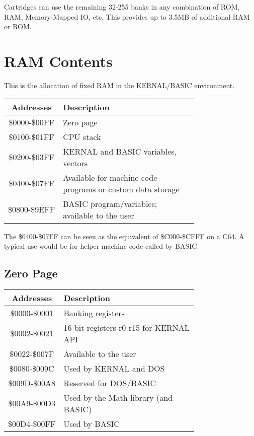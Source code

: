 Cartridges can use the remaining 32-255 banks in any combination of ROM, RAM,
Memory-Mapped IO, etc.  This provides up to 3.5MB of additional RAM or ROM.\\

\section{RAM Contents}

This is the allocation of fixed RAM in the KERNAL/BASIC environment.\\

\begin{tabular}{|c|p{0.75\linewidth}|}
	\hline
	{\bfseries Addresses} & {\bfseries Description}\\ \hline
	\$0000-\$00FF & Zero page\\ \hline
	\$0100-\$01FF & CPU stack\\ \hline
	\$0200-\$03FF & KERNAL and BASIC variables, vectors\\ \hline
	\$0400-\$07FF & Available for machine code programs or custom data storage\\ \hline
	\$0800-\$9EFF & BASIC program/variables; available to the user\\ \hline
\end{tabular}

\vspace{16pt}

The \$0400-\$07FF can be seen as the equivalent of \$C000-\$CFFF on a C64. A
typical use would be for helper machine code called by BASIC.\\

\subsection{Zero Page}

\begin{tabular}{|c|p{0.75\linewidth}|}
	\hline
	{\bfseries Addresses} & {\bfseries Description}\\ \hline
	\$0000-\$0001 & Banking registers\\ \hline
	\$0002-\$0021 & 16 bit registers r0-r15 for KERNAL API\\ \hline
	\$0022-\$007F & Available to the user\\ \hline
	\$0080-\$009C & Used by KERNAL and DOS\\ \hline
	\$009D-\$00A8 & Reserved for DOS/BASIC\\ \hline
	\$00A9-\$00D3 & Used by the Math library (and BASIC)\\ \hline
	\$00D4-\$00FF & Used by BASIC\\ \hline
\end{tabular}

